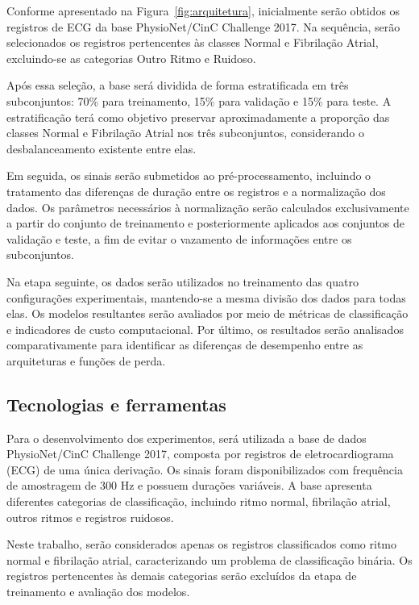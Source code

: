 \documentclass[
    12pt,                %
    openright,           %
    oneside,             %
    a4paper,             %
    english,             %
    brazil               %
]{abntex2}
\begin{document}
Conforme apresentado na Figura~\ref{fig:arquitetura},
inicialmente serão obtidos os registros de ECG da base
PhysioNet/CinC Challenge 2017. Na sequência, serão
selecionados os registros pertencentes às classes
Normal e Fibrilação Atrial, excluindo-se as categorias
Outro Ritmo e Ruidoso.

Após essa seleção, a base será dividida de forma
estratificada em três subconjuntos: 70\% para treinamento,
15\% para validação e 15\% para teste. A estratificação
terá como objetivo preservar aproximadamente a proporção
das classes Normal e Fibrilação Atrial nos três
subconjuntos, considerando o desbalanceamento existente
entre elas.

Em seguida, os sinais serão submetidos ao
pré-processamento, incluindo o tratamento das diferenças
de duração entre os registros e a normalização dos dados.
Os parâmetros necessários à normalização serão calculados
exclusivamente a partir do conjunto de treinamento e
posteriormente aplicados aos conjuntos de validação e
teste, a fim de evitar o vazamento de informações entre
os subconjuntos.

Na etapa seguinte, os dados serão utilizados no
treinamento das quatro configurações experimentais,
mantendo-se a mesma divisão dos dados para todas elas.
Os modelos resultantes serão avaliados por meio de
métricas de classificação e indicadores de custo
computacional. Por último, os resultados serão
analisados comparativamente para identificar as
diferenças de desempenho entre as arquiteturas e
funções de perda.

\subsection{Tecnologias e ferramentas}

Para o desenvolvimento dos experimentos, será utilizada a base de dados
PhysioNet/CinC Challenge 2017, composta por registros de
eletrocardiograma (ECG) de uma única derivação. Os sinais foram
disponibilizados com frequência de amostragem de 300 Hz e possuem
durações variáveis. A base apresenta diferentes categorias de
classificação, incluindo ritmo normal, fibrilação atrial, outros
ritmos e registros ruidosos.

Neste trabalho, serão considerados apenas os registros classificados
como ritmo normal e fibrilação atrial, caracterizando um problema de
classificação binária. Os registros pertencentes às demais categorias
serão excluídos da etapa de treinamento e avaliação dos modelos.
\end{document}
